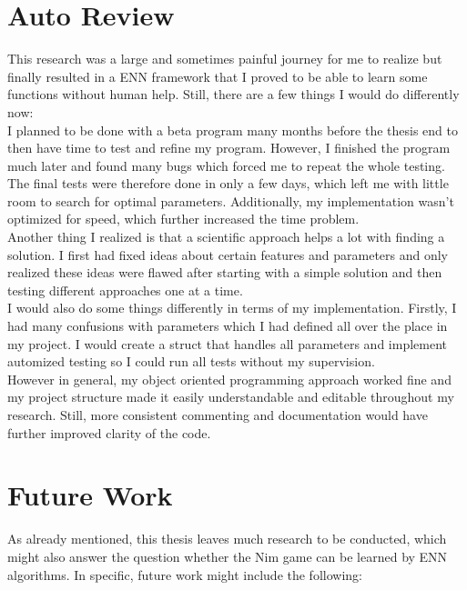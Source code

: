 \documentclass[11pt]{report}
\begin{document}
\begin{enumerate}
    \section{Auto Review}\label{sec:auto-review}
    This research was a large and sometimes painful journey for me to realize but finally resulted in a ENN framework that I proved to be able to learn some functions without human help.
    Still, there are a few things I would do differently now:
    \\
    I planned to be done with a beta program many months before the thesis end to then have time to test and refine my program.
    However, I finished the program much later and found many bugs which forced me to repeat the whole testing.
    The final tests were therefore done in only a few days, which left me with little room to search for optimal parameters.
    Additionally, my implementation wasn't optimized for speed, which further increased the time problem.
    \\
    Another thing I realized is that a scientific approach helps a lot with finding a solution.
    I first had fixed ideas about certain features and parameters and only realized these ideas were flawed after starting with a simple solution and then testing different approaches one at a time.
    \\
    I would also do some things differently in terms of my implementation.
    Firstly, I had many confusions with parameters which I had defined all over the place in my project.
    I would create a struct that handles all parameters and implement automized testing so I could run all tests without my supervision.
    \\
    However in general, my object oriented programming approach worked fine and my project structure made it easily understandable and editable throughout my research.
    Still, more consistent commenting and documentation would have further improved clarity of the code.


    \section{Future Work}\label{sec:future-work}
    As already mentioned, this thesis leaves much research to be conducted, which might also answer the question whether the Nim game can be learned by ENN algorithms.
    In specific, future work might include the following:


\end{enumerate}
\end{document}
